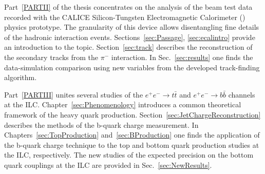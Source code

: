 Part~\ref{PARTII} of the thesis concentrates on the analysis of the beam test data recorded with the CALICE Silicon-Tungsten Electromagnetic Calorimeter (\ecal) physics prototype. The granularity of this device allows disentangling fine details of the hadronic interaction events. Sections~\ref{sec:Passage}, \ref{sec:ecalintro} provide an introduction to the topic. Section~\ref{sec:track} describes the reconstruction of the secondary tracks from the $\pi^-$ interaction. 
In Sec.~\ref{sec:results} one finds the data-simulation comparison using new variables from the developed track-finding algorithm.

Part~\ref{PARTIII} unites several studies  of the $e^+e^- \to t\bar{t}$ and $e^+e^- \to b\bar{b}$ channels at the ILC.%
Chapter~\ref{sec:Phenomenology} introduces a common theoretical framework of the heavy quark production. Section~\ref{sec:JetChargeReconstruction} describes the methods of the b-quark charge measurement. In Chapters~\ref{sec:TopProduction} and~\ref{sec:BProduction} one finds the application of the b-quark charge technique to the top and bottom quark production studies at the ILC, respectively. The new studies of the expected precision on the bottom quark couplings at the ILC are provided in Sec.~\ref{sec:NewResults}. 











